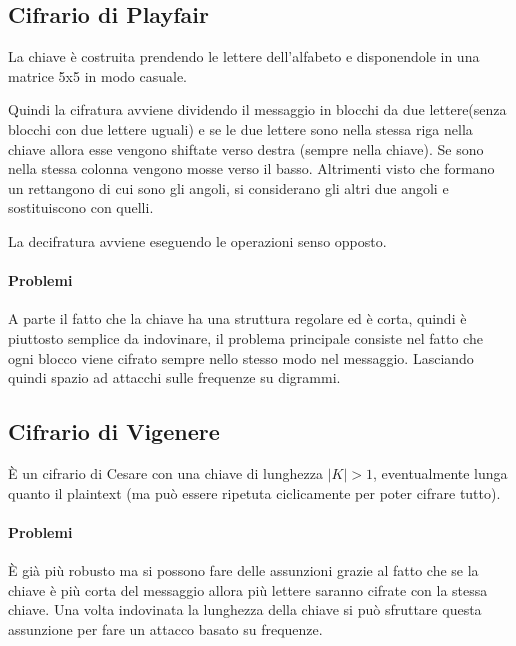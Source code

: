 \subsection{Cifrario di Playfair}

La chiave \`e costruita prendendo le lettere dell'alfabeto e disponendole in una matrice 5x5 in modo casuale.


Quindi la cifratura avviene dividendo il messaggio in blocchi da due lettere(senza blocchi con due lettere uguali) e se le due lettere sono nella stessa riga nella chiave allora esse vengono shiftate verso destra (sempre nella chiave). Se sono nella stessa colonna vengono mosse verso il basso.
Altrimenti visto che formano un rettangono di cui sono gli angoli, si considerano gli altri due angoli e sostituiscono con quelli.

La decifratura avviene eseguendo le operazioni senso opposto.

\paragraph{Problemi}

A parte il fatto che la chiave ha una struttura regolare ed \`e corta, quindi \`e piuttosto semplice da indovinare, il problema principale consiste nel fatto che ogni blocco viene cifrato sempre nello stesso modo nel messaggio. Lasciando quindi spazio ad attacchi sulle frequenze su digrammi.

\subsection{Cifrario di Vigenere}

\`E un cifrario di Cesare con una chiave di lunghezza $|K| > 1$, eventualmente lunga quanto il plaintext (ma pu\`o essere ripetuta ciclicamente per poter cifrare tutto).

\paragraph{Problemi}

\`E gi\`a pi\`u robusto ma si possono fare delle assunzioni grazie al fatto che se la chiave \`e pi\`u corta del messaggio allora pi\`u lettere saranno cifrate con la stessa chiave. Una volta indovinata la lunghezza della chiave si pu\`o sfruttare questa assunzione per fare un attacco basato su frequenze.

